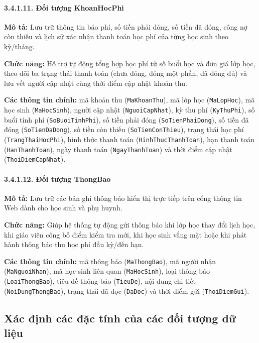 \paragraph{3.4.1.11. Đối tượng KhoanHocPhi}\mbox{}\par
\textbf{Mô tả:} Lưu trữ thông tin báo phí, số tiền phải đóng, số tiền đã đóng, công nợ còn thiếu và lịch sử xác nhận thanh toán học phí của từng học sinh theo kỳ/tháng.\par
\textbf{Chức năng:} Hỗ trợ tự động tổng hợp học phí từ số buổi học và đơn giá lớp học, theo dõi ba trạng thái thanh toán (chưa đóng, đóng một phần, đã đóng đủ) và lưu vết người cập nhật cùng thời điểm cập nhật khoản thu.\par
\textbf{Các thông tin chính:} mã khoản thu (\texttt{MaKhoanThu}), mã lớp học (\texttt{MaLopHoc}), mã học sinh (\texttt{MaHocSinh}), người cập nhật (\texttt{NguoiCapNhat}), kỳ thu phí (\texttt{KyThuPhi}), số buổi tính phí (\texttt{SoBuoiTinhPhi}), số tiền phải đóng (\texttt{SoTienPhaiDong}), số tiền đã đóng (\texttt{SoTienDaDong}), số tiền còn thiếu (\texttt{SoTienConThieu}), trạng thái học phí (\texttt{TrangThaiHocPhi}), hình thức thanh toán (\texttt{HinhThucThanhToan}), hạn thanh toán (\texttt{HanThanhToan}), ngày thanh toán (\texttt{NgayThanhToan}) và thời điểm cập nhật (\texttt{ThoiDiemCapNhat}).

\paragraph{3.4.1.12. Đối tượng ThongBao}\mbox{}\par
\textbf{Mô tả:} Lưu trữ các bản ghi thông báo hiển thị trực tiếp trên cổng thông tin Web dành cho học sinh và phụ huynh.\par
\textbf{Chức năng:} Giúp hệ thống tự động gửi thông báo khi lớp học thay đổi lịch học, khi giáo viên công bố điểm kiểm tra mới, khi học sinh vắng mặt hoặc khi phát hành thông báo thu học phí đầu kỳ/đến hạn.\par
\textbf{Các thông tin chính:} mã thông báo (\texttt{MaThongBao}), mã người nhận (\texttt{MaNguoiNhan}), mã học sinh liên quan (\texttt{MaHocSinh}), loại thông báo (\texttt{LoaiThongBao}), tiêu đề thông báo (\texttt{TieuDe}), nội dung chi tiết (\texttt{NoiDungThongBao}), trạng thái đã đọc (\texttt{DaDoc}) và thời điểm gửi (\texttt{ThoiDiemGui}).

\subsection{Xác định các đặc tính của các đối tượng dữ liệu}

